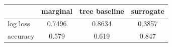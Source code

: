 \begin{tabular}{lccc}
\toprule
 & marginal & tree baseline & surrogate \\
\midrule
log loss & 0.7496 & 0.8634 & 0.3857 \\
accuracy & 0.579 & 0.619 & 0.847 \\
\bottomrule
\end{tabular}
